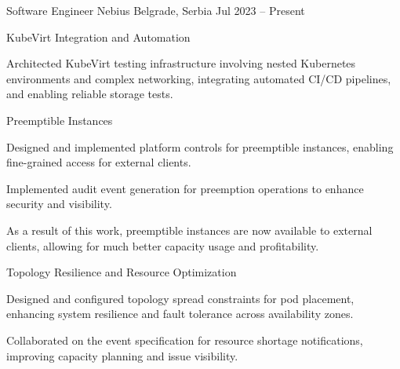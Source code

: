 

\begin{cventries}
  \cventry
  {Software Engineer} %
  {Nebius} %
  {Belgrade, Serbia} %
  {Jul 2023 -- Present} %
  {
    \begin{cvitems} %
        \item{KubeVirt Integration and Automation}
        \begin{cvitemsnested}
        \item{Architected KubeVirt testing infrastructure involving nested Kubernetes environments and complex networking, integrating automated CI/CD pipelines, and enabling reliable storage tests.}
        \end{cvitemsnested}
        \item{Preemptible Instances}
        \begin{cvitemsnested}
        \item{Designed and implemented platform controls for preemptible instances, enabling fine-grained access for external clients.}
        \item{Implemented audit event generation for preemption operations to enhance security and visibility.}
        \item{As a result of this work, preemptible instances are now available to external clients, allowing for much better capacity usage and profitability.}
        \end{cvitemsnested}
        \item{Topology Resilience and Resource Optimization}
        \begin{cvitemsnested}
        \item{Designed and configured topology spread constraints for pod placement, enhancing system resilience and fault tolerance across availability zones.}
        \item{Collaborated on the event specification for resource shortage notifications, improving capacity planning and issue visibility.}
        \end{cvitemsnested}

\end{cvitems}}
\end{cventries}
